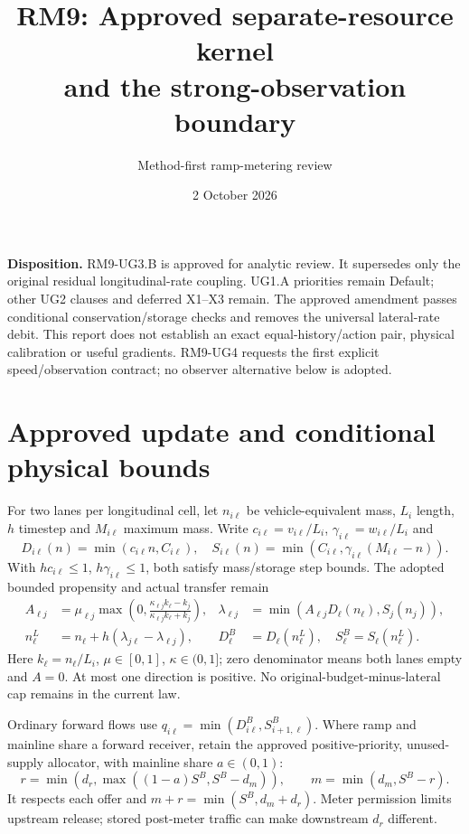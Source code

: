 \documentclass[10pt,a4paper]{article}
\title{RM9: Approved separate-resource kernel\\and the strong-observation boundary}
\author{Method-first ramp-metering review}
\date{2 October 2026}
\begin{document}
\maketitle
\noindent\textbf{Disposition.} RM9-UG3.B is approved for analytic review.
It supersedes only the original residual longitudinal-rate coupling.
UG1.A priorities remain Default; other UG2 clauses and deferred X1--X3 remain.
The approved amendment passes conditional conservation/storage checks and
removes the universal lateral-rate debit. This report does not establish an
exact equal-history/action pair, physical calibration or useful gradients.
RM9-UG4 requests the first explicit speed/observation contract; no observer
alternative below is adopted.

\section{Approved update and conditional physical bounds}
For two lanes per longitudinal cell, let $n_{i\ell}$ be vehicle-equivalent
mass, $L_i$ length, $h$ timestep and $M_{i\ell}$ maximum mass.
Write $c_{i\ell}=v_{i\ell}/L_i$, $\gamma_{i\ell}=w_{i\ell}/L_i$ and
\begin{equation}
D_{i\ell}(n)=\min(c_{i\ell}n,C_{i\ell}),\quad
S_{i\ell}(n)=\min(C_{i\ell},\gamma_{i\ell}(M_{i\ell}-n)).
\end{equation}
With $h c_{i\ell}\leq1$, $h\gamma_{i\ell}\leq1$, both satisfy mass/storage
step bounds. The adopted bounded propensity and actual transfer remain
\begin{align}
A_{\ell j}&=\mu_{\ell j}\max\left(0,
\frac{\kappa_{\ell j}k_\ell-k_j}{\kappa_{\ell j}k_\ell+k_j}\right),
&\lambda_{\ell j}&=\min(A_{\ell j}D_\ell(n_\ell),S_j(n_j)),\\
n_\ell^L&=n_\ell+h(\lambda_{j\ell}-\lambda_{\ell j}),
&D_\ell^B&=D_\ell(n_\ell^L),\quad S_\ell^B=S_\ell(n_\ell^L).
\end{align}
Here $k_\ell=n_\ell/L_i$, $\mu\in[0,1]$, $\kappa\in(0,1]$; zero denominator
means both lanes empty and $A=0$. At most one direction is positive.
No original-budget-minus-lateral cap remains in the current law.

Ordinary forward flows use $q_{i\ell}=\min(D_{i\ell}^B,S_{i+1,\ell}^B)$.
Where ramp and mainline share a forward receiver, retain the approved
positive-priority, unused-supply allocator, with mainline share $a\in(0,1)$:
\begin{equation}
r=\min(d_r,\max((1-a)S^B,S^B-d_m)),\qquad m=\min(d_m,S^B-r).
\end{equation}
It respects each offer and $m+r=\min(S^B,d_m+d_r)$. Meter permission limits
upstream release; stored post-meter traffic can make downstream $d_r$ different.
\end{document}
